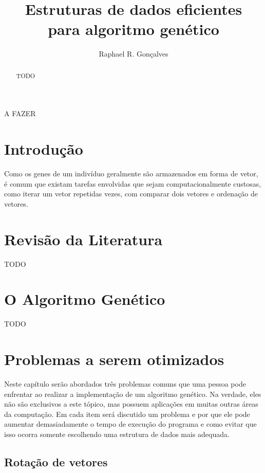 \documentclass[12pt]{article}
\title{Estruturas de dados eficientes\\ para algoritmo gen\'{e}tico}
\author{Raphael R. Gon\c{c}alves\inst{1}}
\begin{document}
 

\maketitle

\begin{abstract}
    TODO
\end{abstract}
     
\begin{resumo} 
    A FAZER
\end{resumo}


\section{Introdu\c{c}\~{a}o}

Como os genes de um indiv\'{i}duo geralmente s\~{a}o armazenados em forma de vetor, \'{e} comum
que existam tarefas envolvidas que sejam computacionalmente custosas, como iterar um vetor repetidas
vezes, com comparar dois vetores e ordena\c{c}\~{a}o de vetores.

\section{Revis\~{a}o da Literatura} \label{sec:firstpage}

TODO

\section{O Algoritmo Gen\'{e}tico}

TODO

\section{Problemas a serem otimizados}

Neste cap\'{i}tulo ser\~{a}o abordados tr\^{e}s problemas comuns que uma pessoa pode enfrentar ao
realizar a implementa\c{c}\~{a}o de um algoritmo gen\'{e}tico. Na verdade, eles n\~{a}o s\~{a}o
exclusivos a este t\'{o}pico, mas possuem aplica\c{c}\~{o}es em muitas outras \'{a}reas
da computa\c{c}\~{a}o. Em cada item ser\'{a} discutido um problema e por que ele
pode aumentar demasiadamente o tempo de execu\c{c}\~{a}o do programa e como evitar que
isso ocorra somente escolhendo uma estrutura de dados mais adequada.

\subsection{Rota\c{c}\~{a}o de vetores}
\end{document}
